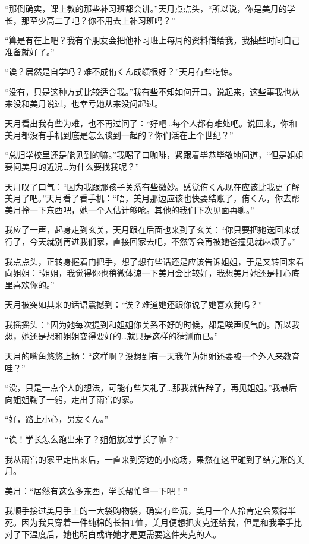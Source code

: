 “那倒确实，课上教的那些补习班都会讲。”天月点点头，“所以说，你是美月的学长，那至少高二了吧？你不用去上补习班吗？”

“算是有在上吧？我有个朋友会把他补习班上每周的资料借给我，我抽些时间自己准备就好了。”

“诶？居然是自学吗？难不成侑くん成绩很好？”天月有些吃惊。

“没有，只是这种方式比较适合我。”我有些不知如何开口。说起来，这些事我也从来没和美月说过，也幸亏她从来没问起过。

天月看出我有些为难，也不再过问了：“好吧…每个人都有难处吧。说回来，你和美月都没有手机到底是怎么谈到一起的？你们活在上个世纪？”

“总归学校里还是能见到的嘛。”我喝了口咖啡，紧跟着毕恭毕敬地问道，“但是姐姐要问美月的近况…为什么要找我呢？”

天月叹了口气：“因为我跟那孩子关系有些微妙。感觉侑くん现在应该比我更了解美月了吧。”天月看了看手机：“唔，美月那边应该也快要结账了，侑くん，你去帮美月拎一下东西吧，她一个人估计够呛。其他的我们下次见面再聊。”

我应了一声，起身走到玄关，天月跟在后面也来到了玄关：“你只要把她送回来就行了，今天就别再进我们家，直接回家去吧，不然等会再被她爸撞见就麻烦了。”

我点点头，正转身握着门把手，想了想有些话还是应该告诉姐姐，于是又转回来看向姐姐：“姐姐，我觉得你也稍微体谅一下美月会比较好，我想美月她还是打心底里喜欢你的。”

天月被突如其来的话语震撼到：“诶？难道她还跟你说了她喜欢我吗？”

我摇摇头：“因为她每次提到和姐姐你关系不好的时候，都是唉声叹气的。所以我想，她还是想和姐姐变得要好的…就只是这样的猜测而已。”

天月的嘴角悠悠上扬：“这样啊？没想到有一天我作为姐姐还要被一个外人来教育哇？”

“没，只是一点个人的想法，可能有些失礼了…那我就告辞了，再见姐姐。”我最后向姐姐鞠了一躬，走出了雨宫的家。

“好，路上小心，男友くん。”

\cutlinef\turned

“诶！学长怎么跑出来了？姐姐放过学长了嘛？”

我从雨宫的家里走出来后，一直来到旁边的小商场，果然在这里碰到了结完账的美月。

美月：“居然有这么多东西，学长帮忙拿一下吧！”

我顺手接过美月手上的一大袋购物袋，确实有些沉，美月一个人拎肯定会累得半死。因为我只穿着一件纯棉的长袖T恤，美月便想把夹克还给我，但是和我牵手比对了下温度后，她也明白或许她才是更需要这件夹克的人。

